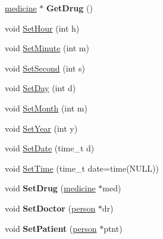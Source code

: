 \begin{DoxyCompactItemize}
\item 
\hypertarget{classprescription_ab0db387bdcc5b44e29a72c862d24426b}{\hyperlink{structmedicine}{medicine} $\ast$ {\bfseries Get\-Drug} ()}\label{d0/dd9/classprescription_ab0db387bdcc5b44e29a72c862d24426b}

\item 
void \hyperlink{classprescription_a1e876ae983decf3c3e4425dfccd64805}{Set\-Hour} (int h)
\item 
void \hyperlink{classprescription_a35c70e5bcdf1263afd2a52f6e47accbd}{Set\-Minute} (int m)
\item 
void \hyperlink{classprescription_a5efb71a441fa5671a60180ca30b5882b}{Set\-Second} (int s)
\item 
void \hyperlink{classprescription_a093553b6c876eefd7933864ddf6fef97}{Set\-Day} (int d)
\item 
void \hyperlink{classprescription_a8272667bc6cecf8b242362ca1ae801c3}{Set\-Month} (int m)
\item 
void \hyperlink{classprescription_a76114a03aea0bb0d56084268d5d89608}{Set\-Year} (int y)
\item 
void \hyperlink{classprescription_aa5272268cd360a4376ff2a8c05d8d240}{Set\-Date} (time\-\_\-t d)
\item 
void \hyperlink{classprescription_a9e19ba585000fe3d662f4c59102806c7}{Set\-Time} (time\-\_\-t date=time(N\-U\-L\-L))
\item 
\hypertarget{classprescription_a298a366067d002733400cfdee817bced}{void {\bfseries Set\-Drug} (\hyperlink{structmedicine}{medicine} $\ast$med)}\label{d0/dd9/classprescription_a298a366067d002733400cfdee817bced}

\item 
\hypertarget{classprescription_a70d211d36d42f8f1379aaed0b09466c3}{void {\bfseries Set\-Doctor} (\hyperlink{classperson}{person} $\ast$dr)}\label{d0/dd9/classprescription_a70d211d36d42f8f1379aaed0b09466c3}

\item 
\hypertarget{classprescription_a051c3d3aed8aefaf6ba8b48869842011}{void {\bfseries Set\-Patient} (\hyperlink{classperson}{person} $\ast$ptnt)}\label{d0/dd9/classprescription_a051c3d3aed8aefaf6ba8b48869842011}

\end{DoxyCompactItemize}


